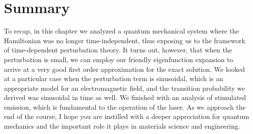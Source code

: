 \section{Summary}

To recap, in this chapter we analyzed a quantum mechanical system where the Hamiltonian was no longer time-independent, thus exposing us to the framework of time-dependent perturbation theory. 
It turns out, however, that when the perturbation is small, we can employ our friendly eigenfunction expansion to arrive at a very good first order approximation for the exact solution. 
We looked at a particular case when the perturbation term is sinusoidal, which is an appropriate model for an electromagnetic field, and the transition probability we derived was sinusoidal in time as well. 
We finished with an analysis of stimulated emission, which is fundamental to the operation of the laser.
As we approach the end of the course, I hope you are instilled with a deeper appreciation for quantum mechanics and the important role it plays in materials science and engineering.

%